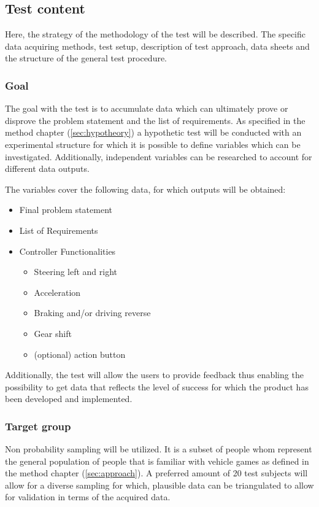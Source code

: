 \subsection{Test content} \label{sec:testcontent}
Here, the strategy of the methodology of the test will be described. 
The specific data acquiring methods, test setup, description of test approach, data sheets and the structure of the general test procedure.

\subsubsection{Goal}
The goal with the test is to accumulate data which can ultimately prove or disprove the problem statement and the list of requirements. As specified in the method chapter (\ref{sec:hypotheory}) a hypothetic test will be conducted with an experimental structure for which it is possible to define variables which can be investigated. Additionally, independent variables can be researched to account for different data outputs.


The variables cover the following data, for which outputs will be obtained:
\begin{itemize}
	\item Final problem statement
	\item List of Requirements
	\item Controller Functionalities
	\begin{itemize}
		\item Steering left and right
		\item Acceleration
		\item Braking and/or driving reverse
		\item Gear shift
		\item (optional) action button
	\end{itemize}
\end{itemize}

Additionally, the test will allow the users to provide feedback thus enabling the possibility to get data that reflects the level of success for which the product has been developed and implemented. 

\subsubsection{Target group}
Non probability sampling will be utilized. 
It is a subset of people whom represent the general population of people that is familiar with vehicle games as defined in the method chapter (\ref{sec:approach}).
A preferred amount of 20 test subjects will allow for a diverse sampling for which, plausible data can be triangulated to allow for validation in terms of the acquired data.

